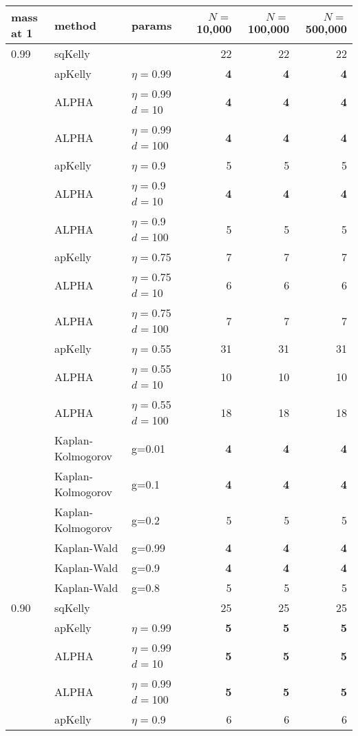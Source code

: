 \documentclass[12pt,runningheads]{llncs}
\begin{document}
{\begin{table}
\centering
\tiny
\begin{tabular}{lll|rrr} 
 mass at 1 & method & params & $N=$10,000 &  $N=$100,000 & $N=$500,000 \\
\hline 0.99 & sqKelly & & 22  & 22  & 22  \\
\cline{2-6} & apKelly & $\eta=$0.99 & \bf{4}  & \bf{4}  & \bf{4}  \\
\cline{2-6}
& ALPHA & $\eta=$0.99 $d=$10 & \bf{4}  & \bf{4}  & \bf{4}  \\
& ALPHA & $\eta=$0.99 $d=$100 & \bf{4}  & \bf{4}  & \bf{4}  \\
\cline{2-6} & apKelly & $\eta=$0.9 & 5  & 5  & 5  \\
\cline{2-6}
& ALPHA & $\eta=$0.9 $d=$10 & \bf{4}  & \bf{4}  & \bf{4}  \\
& ALPHA & $\eta=$0.9 $d=$100 & 5  & 5  & 5  \\
\cline{2-6} & apKelly & $\eta=$0.75 & 7  & 7  & 7  \\
\cline{2-6}
& ALPHA & $\eta=$0.75 $d=$10 & 6  & 6  & 6  \\
& ALPHA & $\eta=$0.75 $d=$100 & 7  & 7  & 7  \\
\cline{2-6} & apKelly & $\eta=$0.55 & 31  & 31  & 31  \\
\cline{2-6}
& ALPHA & $\eta=$0.55 $d=$10 & 10  & 10  & 10  \\
& ALPHA & $\eta=$0.55 $d=$100 & 18  & 18  & 18  \\
\cline{2-6}
 & Kaplan-Kolmogorov & g=0.01 & \bf{4}  & \bf{4}  & \bf{4}  \\
 & Kaplan-Kolmogorov & g=0.1 & \bf{4}  & \bf{4}  & \bf{4}  \\
 & Kaplan-Kolmogorov & g=0.2 & 5  & 5  & 5  \\
\cline{2-6}
 & Kaplan-Wald & g=0.99 & \bf{4}  & \bf{4}  & \bf{4}  \\
 & Kaplan-Wald & g=0.9 & \bf{4}  & \bf{4}  & \bf{4}  \\
 & Kaplan-Wald & g=0.8 & 5  & 5  & 5  \\
\hline 0.90 & sqKelly & & 25  & 25  & 25  \\
\cline{2-6} & apKelly & $\eta=$0.99 & \bf{5}  & \bf{5}  & \bf{5}  \\
\cline{2-6}
& ALPHA & $\eta=$0.99 $d=$10 & \bf{5}  & \bf{5}  & \bf{5}  \\
& ALPHA & $\eta=$0.99 $d=$100 & \bf{5}  & \bf{5}  & \bf{5}  \\
\cline{2-6} & apKelly & $\eta=$0.9 & 6  & 6  & 6  \\

\end{tabular}
\end{table}}
\end{document}
